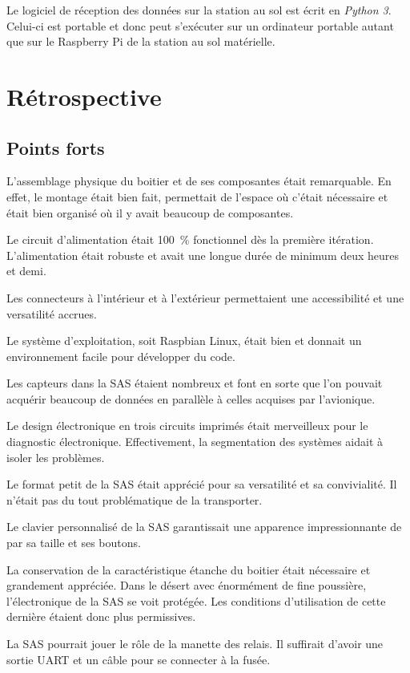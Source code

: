Le logiciel de réception des données sur la station au sol est écrit en
\textit{Python 3}. Celui-ci est portable et donc peut s'exécuter sur un
ordinateur portable autant que sur le Raspberry Pi de la station au sol
matérielle.

\section{Rétrospective}

\subsection{Points forts}

L’assemblage physique du boitier et de ses composantes était remarquable.
En effet, le montage était bien fait, permettait de l’espace où c’était
nécessaire et était bien organisé où il y avait beaucoup de composantes.
\par
Le circuit d’alimentation était 100~\% fonctionnel dès la première itération.
L’alimentation était robuste et avait une longue durée de minimum deux heures
et demi.
\par
Les connecteurs à l’intérieur et à l’extérieur permettaient une accessibilité
et une versatilité accrues.
\par
Le système d’exploitation, soit Raspbian Linux, était bien et donnait un
environnement facile pour développer du code.
\par
Les capteurs dans la SAS étaient nombreux et font en sorte que l’on pouvait
acquérir beaucoup de données en parallèle à celles acquises par l’avionique.
\par
Le design électronique en trois circuits imprimés était merveilleux pour le
diagnostic électronique. Effectivement, la segmentation des systèmes aidait à
isoler les problèmes.
\par
Le format petit de la SAS était apprécié pour sa versatilité et sa
convivialité. Il n’était pas du tout problématique de la transporter.
\par
Le clavier personnalisé de la SAS garantissait une apparence impressionnante de
par sa taille et ses boutons.
\par
La conservation de la caractéristique étanche du boitier était nécessaire et
grandement appréciée. Dans le désert avec énormément de fine poussière,
l’électronique de la SAS se voit protégée. Les conditions d’utilisation de
cette dernière étaient donc plus permissives.
\par
La SAS pourrait jouer le rôle de la manette des relais. Il suffirait d'avoir une
sortie UART et un câble pour se connecter à la fusée.

